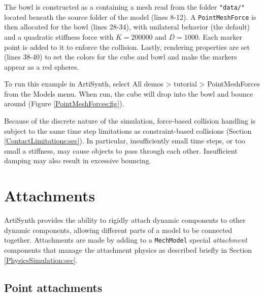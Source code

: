The bowl is constructed as a  containing a mesh
read from the folder {\tt "data/"} located beneath the source folder of the
model (lines 8-12). A {\tt PointMeshForce} is then allocated for the bowl
(lines 28-34), with unilateral behavior (the default) and a quadratic stiffness
force with $K = 200000$ and $D = 1000$. Each marker point is added to it to
enforce the collision. Lastly, rendering properties are set (lines 38-40) to
set the colors for the cube and bowl and make the markers appear as a red
spheres.

To run this example in ArtiSynth, select {\sf All demos > tutorial >
PointMeshForces} from the {\sf Models} menu. When run, the cube will drop into
the bowl and bounce around (Figure \ref{PointMeshForces:fig}).

\begin{sideblock}
Because of the discrete nature of the simulation, force-based collision
handling is subject to the same time step limitations as constraint-based
collisions (Section \ref{ContactLimitations:sec}). In particular,
insufficiently small time steps, or too small a stiffness, may cause objects to
pass through each other. Insufficient damping may also result
in excessive bouncing.
\end{sideblock}

\section{Attachments}
\label{Attachments:sec}

ArtiSynth provides the ability to rigidly attach dynamic components to other
dynamic components, allowing different parts of a model to be connected
together.  Attachments are made by adding to a {\tt MechModel} special {\it
attachment} components that manage the attachment physics as described briefly
in Section
\ref{PhysicsSimulation:sec}.

\subsection{Point attachments}
\label{sec:mech:pointattachments}

